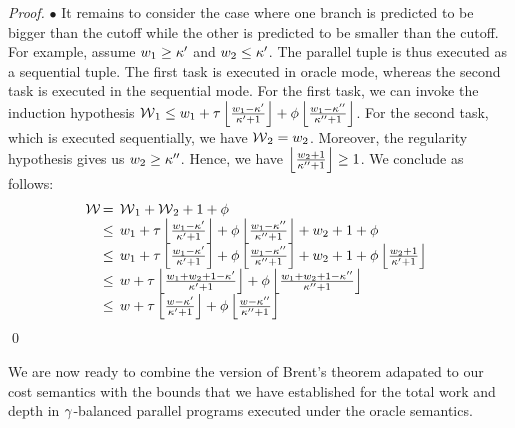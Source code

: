 \begin{proof}
$\bullet$  It remains to consider the case where one branch
is predicted to be bigger than the cutoff while the other
is predicted to be smaller than the cutoff. For example,
assume $w_1 \geq {\kappa}'$ and $w_2 \leq {\kappa}'$.
The parallel tuple is thus executed as a sequential tuple.
The first task is executed in oracle mode, whereas the
second task is executed in the sequential mode.
For the first task, we can invoke the induction hypothesis
${\mathcal{W}}{}_1 \leq w_1 + {\tau} \left\lfloor \frac{w_1-{\kappa}'}{{\kappa}'+1} \right\rfloor + {\phi} \left\lfloor \frac{w_1-{\kappa}''}{{\kappa}''+1} \right\rfloor $.
For the second task, which is executed sequentially, we have ${\mathcal{W}}{}_2 = w_2$.
Moreover, the regularity hypothesis gives us $w_2 \geq {\kappa}''$.
Hence, we have $\left\lfloor \frac{w_2+1}{{\kappa}''+1} \right\rfloor \geq 1$.
We conclude as follows:
%
$$\begin{array}{@{}l@{}ll}
\sws 
& \Sc{=} \sws{}_1 + \sws{}_2 + 1 + \corc \\ 
& \Sc\leq w_1 + \csp \floorfrac{w_1-\coffe}{\coffe+1} 
+ \corc \floorfrac{w_1-\coffr}{\coffr+1} + w_2 + 1 + \corc \\
& \Sc\leq w_1 + \csp \floorfrac{w_1-\coffe}{\coffe+1} 
+ \corc \floorfrac{w_1-\coffr}{\coffr+1} + w_2 + 1 + \corc \floorfrac{w_2+1}{\coffe+1} \\
& \Sc\leq \sw + \csp \floorfrac{w_1+w_2+1-\coffe}{\coffe+1} + \corc \floorfrac{w_1+w_2+1-\coffr}{\coffr+1} \\
& \Sc\leq \sw + \csp \floorfrac{\sw-\coffe}{\coffe+1} + \corc \floorfrac{\sw-\coffr}{\coffr+1} \\
\end{array}$$
\qed
\end{proof}

We are now ready to combine the version of Brent's theorem
adapated to our cost semantics with the bounds that we
have established for the total work and depth 
in ${\gamma}$-balanced parallel programs executed
under the oracle semantics.


